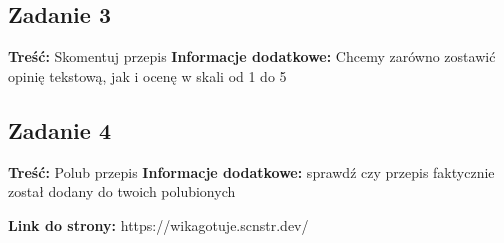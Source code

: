 \documentclass{article}
\begin{document}
\subsection{Zadanie 3}
\textbf{Treść:} Skomentuj przepis\newline
\textbf{Informacje dodatkowe:} Chcemy zarówno zostawić opinię tekstową, jak i ocenę w skali od 1 do 5


\subsection{Zadanie 4}
\textbf{Treść:} Polub przepis\newline
\textbf{Informacje dodatkowe:} sprawdź czy przepis faktycznie został dodany do twoich polubionych 

\textbf{Link do strony:} https://wikagotuje.scnstr.dev/
\end{document}
